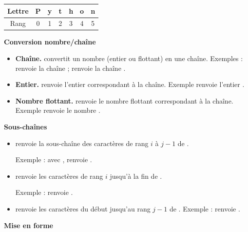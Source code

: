 \documentclass[11pt,class=report,crop=false]{standalone}
\begin{document}
\begin{center}
\begin{tabular}{|c||c|c|c|c|c|c|}
\hline
Lettre & \textbf{P} & \textbf{y} & \textbf{t} & \textbf{h} & \textbf{o} & \textbf{n} \\ \hline
Rang & 0 & 1 & 2 & 3 & 4 & 5 \\ \hline
\end{tabular}
\end{center}


\textbf{Conversion nombre/chaîne}

\begin{itemize}
  \item \textbf{Chaîne.} \quad convertit un nombre (entier ou flottant) en une chaîne.
  Exemples :  renvoie la chaîne  ;  renvoie la chaîne .
  
  \item \textbf{Entier.} \quad renvoie l'entier correspondant à la chaîne. Exemple  renvoie l'entier .
  
   \item \textbf{Nombre flottant.} \quad renvoie le nombre flottant correspondant à la chaîne. Exemple  renvoie le nombre . 
 \end{itemize}  


\bigskip

\textbf{Sous-chaînes}

\begin{itemize}
  \item {}\quad renvoie la sous-chaîne des caractères de rang $i$ à $j-1$ de .
  
   Exemple : avec ,  renvoie .
   
  \item {}\quad renvoie les caractères de rang $i$ jusqu'à la fin de . 
  
  Exemple :
   renvoie .
  
  \item{}\quad renvoie les caractères du début jusqu'au rang $j-1$ de . Exemple :
   renvoie .
  
\end{itemize}


\bigskip
\textbf{Mise en forme}
\end{document}
